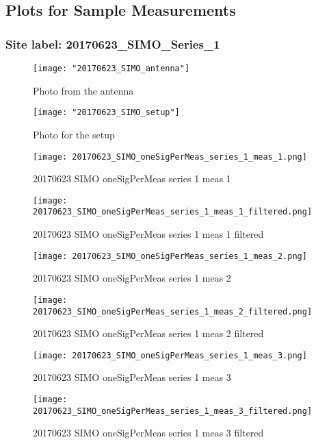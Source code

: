 \subsection{Plots for Sample Measurements}
\subsubsection{Site label: 20170623\_SIMO\_Series\_1}
\begin{figure}[ht] \caption{Photo from the antenna}
\texttt{[image: "20170623\_SIMO\_antenna"]}\centering\end{figure}
\begin{figure}[ht] \caption{Photo for the setup}
\texttt{[image: "20170623\_SIMO\_setup"]}\centering\end{figure}
\begin{figure}[ht] \caption{20170623 SIMO oneSigPerMeas series 1 meas 1}
\texttt{[image: 20170623\_SIMO\_oneSigPerMeas\_series\_1\_meas\_1.png]}\centering\end{figure}
\begin{figure}[ht] \caption{20170623 SIMO oneSigPerMeas series 1 meas 1 filtered}
\texttt{[image: 20170623\_SIMO\_oneSigPerMeas\_series\_1\_meas\_1\_filtered.png]}\centering\end{figure}
\begin{figure}[ht] \caption{20170623 SIMO oneSigPerMeas series 1 meas 2}
\texttt{[image: 20170623\_SIMO\_oneSigPerMeas\_series\_1\_meas\_2.png]}\centering\end{figure}
\begin{figure}[ht] \caption{20170623 SIMO oneSigPerMeas series 1 meas 2 filtered}
\texttt{[image: 20170623\_SIMO\_oneSigPerMeas\_series\_1\_meas\_2\_filtered.png]}\centering\end{figure}
\begin{figure}[ht] \caption{20170623 SIMO oneSigPerMeas series 1 meas 3}
\texttt{[image: 20170623\_SIMO\_oneSigPerMeas\_series\_1\_meas\_3.png]}\centering\end{figure}
\begin{figure}[ht] \caption{20170623 SIMO oneSigPerMeas series 1 meas 3 filtered}
\texttt{[image: 20170623\_SIMO\_oneSigPerMeas\_series\_1\_meas\_3\_filtered.png]}\centering\end{figure}
\clearpage

